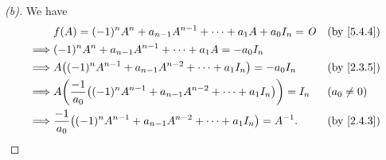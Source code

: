\begin{proof}[(b)]
  We have
  \begin{align*}
             & f(A) = (-1)^n A^n + a_{n - 1} A^{n - 1} + \cdots + a_1 A + a_0 I_n = \zm                    &  & \by{5.4.4}   \\
    \implies & (-1)^n A^n + a_{n - 1} A^{n - 1} + \cdots + a_1 A = -a_0 I_n                                                  \\
    \implies & A \pa{(-1)^n A^{n - 1} + a_{n - 1} A^{n - 2} + \cdots + a_1 I_n} = -a_0 I_n                 &  & \by{2.3.5}   \\
    \implies & A \pa{\dfrac{-1}{a_0} \pa{(-1)^n A^{n - 1} + a_{n - 1} A^{n - 2} + \cdots + a_1 I_n}} = I_n &  & (a_0 \neq 0) \\
    \implies & \dfrac{-1}{a_0} \pa{(-1)^n A^{n - 1} + a_{n - 1} A^{n - 2} + \cdots + a_1 I_n} = A^{-1}.    &  & \by{2.4.3}
  \end{align*}
\end{proof}

